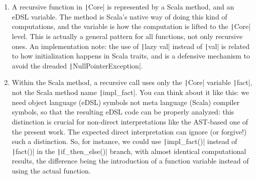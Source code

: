 \documentclass[11pt]{article}
\newcommand{\ScalaI}[1]{\texttt|#1|}
\begin{document}
\begin{enumerate}
  \item A recursive function in \ScalaI{Core} is represented by a Scala method, and an eDSL variable. The method is Scala's native way of doing this kind of computations, and the variable is how the computation is lifted to the \ScalaI{Core} level. This is actually a general pattern for all functions, not only recursive ones. An implementation note: the use of \ScalaI{lazy val} instead of \ScalaI{val} is related to how initialization happens in Scala traits, and is a defensive mechanism to avoid the dreaded \ScalaI{NullPointerException}.
  \item Within the Scala method, a recursive call uses only the \ScalaI{Core} variable \ScalaI{fact}, not the Scala method name \ScalaI{impl_fact}. You can think about it like this: we need object language (eDSL) symbols not meta language (Scala) compiler symbols, so that the resulting eDSL code can be properly analyzed: this distinction is crucial for non-direct interpretations like the AST-based one of the present work. The expected direct interpretation can ignore (or forgive!) such a distinction. So, for instance, we could use \ScalaI{impl_fact()} instead of \ScalaI{fact()} in the \ScalaI{if_then_else()} branch, with almost identical computational results, the difference being the introduction of a function variable instead of using the actual function.
\end{enumerate}

\end{document}
